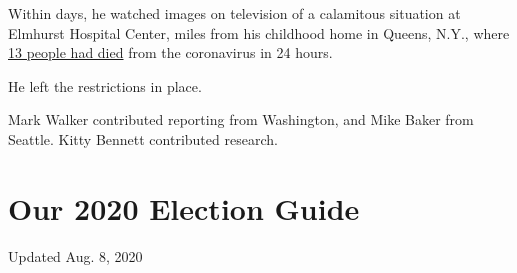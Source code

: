 Within days, he watched images on television of a calamitous situation
at Elmhurst Hospital Center, miles from his childhood home in Queens,
N.Y., where
\href{https://www.nytimes.com/2020/03/25/nyregion/nyc-coronavirus-hospitals.html}{13
people had died} from the coronavirus in 24 hours.

He left the restrictions in place.

Mark Walker contributed reporting from Washington, and Mike Baker from
Seattle. Kitty Bennett contributed research.

\hypertarget{our-2020-election-guide}{%
\section{Our 2020 Election Guide}\label{our-2020-election-guide}}

Updated Aug. 8, 2020


